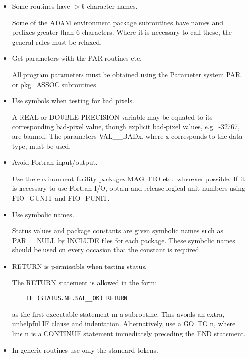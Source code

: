 \begin{itemize}
\item Some routines have $>6$ character names.

Some of the ADAM environment package subroutines have names and prefixes
greater than 6 characters.
Where it is necessary to call these, the general rules must be relaxed.

\item Get parameters with the PAR routines etc.

All program parameters must be obtained using the Parameter system PAR
or pkg\_ASSOC subroutines.

\item Use symbols when testing for bad pixels.

A REAL or DOUBLE PRECISION variable may be equated to its corresponding
bad-pixel value, though explicit bad-pixel values, e.g.\ -32767, are banned.
The parameters VAL\_\_BADx, where x corresponds to the data type, must be
used.

\item Avoid Fortran input/output.

Use the environment facility packages MAG, FIO etc.\ wherever possible.
If it is necessary to use Fortran I/O, obtain and release logical unit numbers
using FIO\_GUNIT and FIO\_PUNIT.

\item Use symbolic names.

Status values and package constants are given symbolic names such as
PAR\_\_NULL by INCLUDE files for each package.
These symbolic names should be used on every occasion that the constant is
required.

\item RETURN is permissible when testing status.

The RETURN statement is allowed in the form:

\begin{small}
\begin{verbatim}
    IF (STATUS.NE.SAI__OK) RETURN
\end{verbatim}
\end{small}

as the first executable statement in a subroutine.
This avoids an extra, unhelpful IF clause and indentation.
Alternatively, use a GO~TO n, where line n is a CONTINUE statement immediately
preceding the END statement.

\item In generic routines use only the standard tokens.


\end{itemize}
